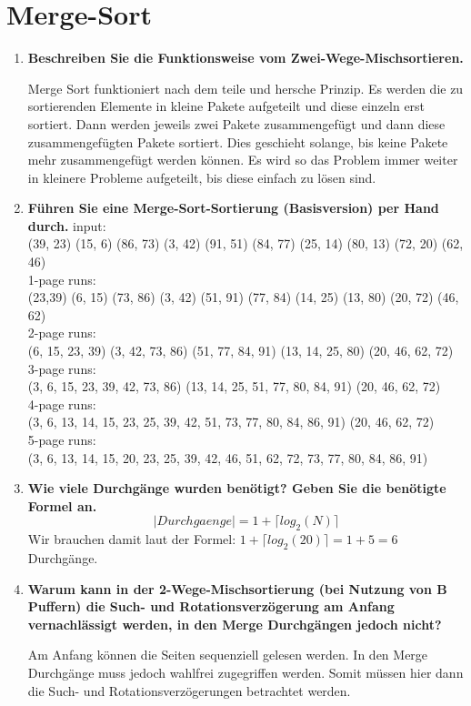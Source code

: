 \documentclass{scrartcl}
\begin{document}
\section{Merge-Sort}
\begin{enumerate}
    \item \textbf{Beschreiben Sie die Funktionsweise vom Zwei-Wege-Mischsortieren.}
    
    Merge Sort funktioniert nach dem teile und hersche Prinzip. Es werden die zu sortierenden Elemente in kleine Pakete aufgeteilt und diese einzeln erst sortiert. Dann werden jeweils zwei Pakete zusammengefügt und dann diese zusammengefügten Pakete sortiert. Dies geschieht solange, bis keine Pakete mehr zusammengefügt werden können. Es wird so das Problem immer weiter in kleinere Probleme aufgeteilt, bis diese einfach zu lösen sind.
    \item \textbf{Führen Sie eine Merge-Sort-Sortierung (Basisversion) per Hand durch.}
    input:\\
    (39, 23) (15, 6) (86, 73) (3, 42) (91, 51) (84, 77) (25, 14) (80, 13) (72, 20) (62, 46)\\
    1-page runs: \\
    (23,39) (6, 15) (73, 86) (3, 42) (51, 91) (77, 84) (14, 25) (13, 80) (20, 72) (46, 62)\\
    2-page runs: \\
    (6, 15, 23, 39) (3, 42, 73, 86) (51, 77, 84, 91) (13, 14, 25, 80) (20, 46, 62, 72)\\
    3-page runs: \\
    (3, 6, 15, 23, 39, 42, 73, 86) (13, 14, 25, 51, 77, 80, 84, 91) (20, 46, 62, 72)\\
    4-page runs: \\
    (3, 6, 13, 14, 15, 23, 25, 39, 42, 51, 73, 77, 80, 84, 86, 91) (20, 46, 62, 72)\\
    5-page runs: \\
    (3, 6, 13, 14, 15, 20, 23, 25, 39, 42, 46, 51, 62, 72, 73, 77, 80, 84, 86, 91)\\
    \item \textbf{Wie viele Durchgänge wurden benötigt? Geben Sie die benötigte Formel an.}
    \[|Durchgaenge|=1+\lceil log_2(N)\rceil\]
    Wir brauchen damit laut der Formel: $1+\lceil log_2(20)\rceil = 1+5 = 6$ Durchgänge.
    \item \textbf{Warum kann in der 2-Wege-Mischsortierung (bei Nutzung von B Puffern) die Such- und Rotationsverzögerung am Anfang vernachlässigt werden, in den Merge Durchgängen jedoch nicht?}
    
    Am Anfang können die Seiten sequenziell gelesen werden. In den Merge Durchgänge muss jedoch wahlfrei zugegriffen werden. Somit müssen hier dann die Such- und Rotationsverzögerungen betrachtet werden.
\end{enumerate}
\end{document}
